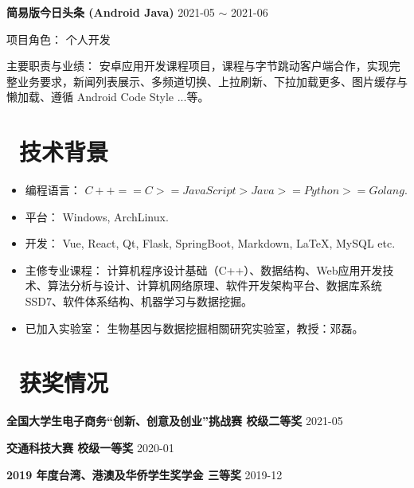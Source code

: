 \documentclass[11pt, a4paper]{article}
\begin{document}
\textbf{简易版今日头条 (Android Java)} \hfill 2021-05 $\sim$ 2021-06

项目角色： \quad 个人开发

主要职责与业绩： \quad 安卓应用开发课程项目，课程与字节跳动客户端合作，实现完整业务要求，新闻列表展示、多频道切换、上拉刷新、下拉加载更多、图片缓存与懒加载、遵循 Android Code Style ...等。

\section{\color{CVBlue}\faCogs\ 技术背景}
\begin{itemize}[parsep=0.5ex]
  \item 编程语言： $C++ == C >= JavaScript > Java >= Python >= Golang$.
  \item 平台： Windows, ArchLinux.
  \item 开发： Vue, React, Qt, Flask, SpringBoot, Markdown, LaTeX, MySQL etc.
  \item 主修专业课程： 计算机程序设计基础（C++）、数据结构、Web应用开发技术、算法分析与设计、计算机网络原理、软件开发架构平台、数据库系统SSD7、软件体系结构、机器学习与数据挖掘。
  \item 已加入实验室： 生物基因与数据挖掘相關研究实验室，教授：邓磊。
\end{itemize}

\section{\color{CVBlue}\faHeart\ 获奖情况}

\textbf{全国大学生电子商务“创新、创意及创业”挑战赛 \quad 校级二等奖} \hfill 2021-05

\textbf{交通科技大赛 \quad 校级一等奖} \hfill 2020-01


\textbf{2019 年度台湾、港澳及华侨学生奖学金 \quad 三等奖} \hfill 2019-12

\end{document}
